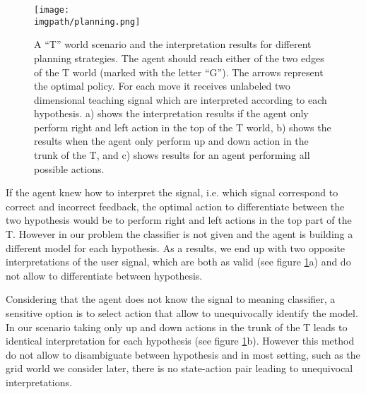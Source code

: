 \begin{figure}[!ht]
  \centering
      \texttt{[image: \\imgpath/planning.png]}
      \caption{A ``T'' world scenario and the interpretation results for different planning strategies. The agent should reach either of the two edges of the T world (marked with the letter ``G''). The arrows represent the optimal policy. For each move it receives unlabeled two dimensional teaching signal which are interpreted according to each hypothesis. a) shows the interpretation results if the agent only perform right and left action in the top of the T world, b) shows the results when the agent only perform up and down action in the trunk of the T, and c) shows results for an agent performing all possible actions.}
    \label{fig:planningExplained}
\end{figure}

If the agent knew how to interpret the signal, i.e. which signal correspond to correct and incorrect feedback, the optimal action to differentiate between the two hypothesis would be to perform right and left actions in the top part of the T. However in our problem the classifier is not given and the agent is building a different model for each hypothesis. As a results, we end up with two opposite interpretations of the user signal, which are both as valid (see figure \ref{fig:planningExplained}a) and do not allow to differentiate between hypothesis.

Considering that the agent does not know the signal to meaning classifier, a sensitive option is to select action that allow to unequivocally identify the model. In our scenario taking only up and down actions in the trunk of the T leads to identical interpretation for each hypothesis (see figure \ref{fig:planningExplained}b). However this method do not allow to disambiguate between hypothesis and in most setting, such as the grid world we consider later, there is no state-action pair leading to unequivocal interpretations.

